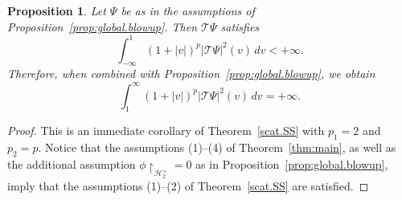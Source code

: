 \documentclass[10pt, reqno]{amsart}
\newtheorem{proposition}[theorem]{Proposition}
\theoremstyle{definition}
\theoremstyle{remark}
\numberwithin{equation}{section}
\newcommand{\rd}{\partial}
\newcommand{\0}{\emptyset}
\newcommand{\calH}{\mathcal H}
\newcommand{\EH}{\calH^{+}}
\begin{document}
\begin{proposition}\label{prop:local.blowup}
Let $\Psi$ be as in the assumptions of Proposition~\ref{prop:global.blowup}. Then $\mathcal T \Psi$ satisfies
$$\int_{-\infty}^{1} (1+|v|)^{p}|\mathcal T \Psi|^2(v)\, dv < +\infty.$$
Therefore, when combined with Proposition~\ref{prop:global.blowup}, we obtain
$$\int_{1}^{\infty} (1+|v|)^{p}|\mathcal T \Psi|^2(v)\, dv = +\infty.$$
\end{proposition}
\begin{proof}
This is an immediate corollary of Theorem~\ref{scat.SS} with $p_1 = 2$ and $p_2 = p$. Notice that the assumptions (1)--(4) of Theorem~\ref{thm:main}, as well as the additional assumption $\phi \restriction_{\calH_{2}^{+}} = 0$ as in Proposition~\ref{prop:global.blowup}, imply that the assumptions (1)--(2) of Theorem~\ref{scat.SS} are satisfied. 
\qedhere
\end{proof}
\end{document}
